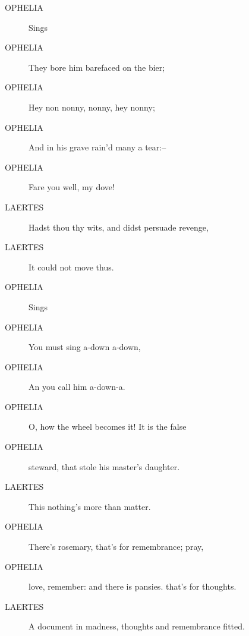 \documentclass{article}
\begin{document}
\begin{description}
            
\item[OPHELIA] 
               Sings
            
\item[OPHELIA] They bore him barefaced on the bier;
\item[OPHELIA] Hey non nonny, nonny, hey nonny;
\item[OPHELIA] And in his grave rain'd many a tear:--
\item[OPHELIA] Fare you well, my dove!
\end{description}
          
\begin{description}
            
\item[LAERTES] Hadst thou thy wits, and didst persuade revenge,
\item[LAERTES] It could not move thus.
\end{description}
          
\begin{description}
            
\item[OPHELIA] 
               Sings
            
\item[OPHELIA] You must sing a-down a-down,
\item[OPHELIA] An you call him a-down-a.
\item[OPHELIA] O, how the wheel becomes it! It is the false
\item[OPHELIA] steward, that stole his master's daughter.
\end{description}
          
\begin{description}
            
\item[LAERTES] This nothing's more than matter.
\end{description}
          
\begin{description}
            
\item[OPHELIA] There's rosemary, that's for remembrance; pray,
\item[OPHELIA] love, remember: and there is pansies. that's for thoughts.
\end{description}
          
\begin{description}
            
\item[LAERTES] A document in madness, thoughts and remembrance fitted.
\end{description}
          
\end{document}
